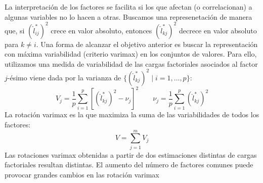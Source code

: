 \documentclass[twoside]{article}
\begin{document}
\begin{enumerate}
\begin{enumerate}
	La interpretación de los factores se facilita si los que afectan (o correlacionan) a algunas variables no lo hacen a otras. Buscamos una represenetación de manera que, si $(\hat{l}_{ij}^*)^2$ crece en valor absoluto, entonces $(\hat{l}_{kj}^*)^2$ decrece en valor absoluto para $k\neq i$. Una forma de alcanzar el objetivo anterior es buscar la representación con máxima variabilidad (criterio varimax) en los conjuntos de valores. Para ello, utilizamos una medida de variabilidad de las cargas factoriales asociados al factor $j$-ésimo viene dada por la varianza de $\{(\hat{l}_{kj}^*)^2\mid i=1,\dotsc,p\}$:
	$$
	V_j =\frac{1}{p}\sum_{i=1}^p \left[(\hat{l}_{kj}^*)^2-\nu_j\right]^2 \qquad \nu_j = \frac{1}{p}\sum_{i=1}^p (\hat{l}_{kj}^*)^2
	$$
La rotación varimax es la que maximiza la suma de las variabilidades de todos los factores: 
$$
V = \sum_{j=1}^m V_j
$$
Las rotaciones varimax obtenidas a partir de dos estimaciones distintas de  cargas factoriales resultan distintas. El aumento del número de factores comunes puede provocar grandes cambios en las rotación varimax
\end{enumerate}
\end{enumerate}

\newpage
\end{document}
